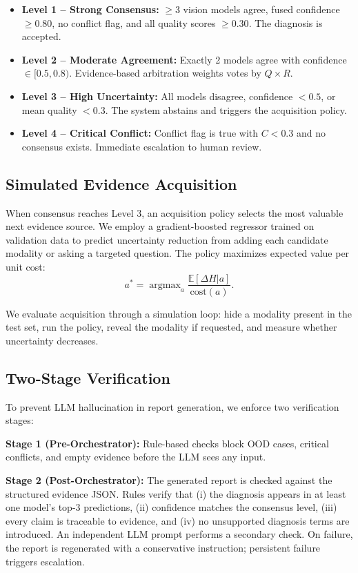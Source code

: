 \documentclass[conference]{IEEEtran}
\newcommand{\expect}[1]{\mathbb{E}\left[#1\right]}
\DeclareMathOperator*{\argmax}{argmax}
\begin{document}
\begin{itemize}
    \item \textbf{Level 1 -- Strong Consensus:} $\geq 3$ vision models agree, fused confidence $\geq 0.80$, no conflict flag, and all quality scores $\geq 0.30$. The diagnosis is accepted.
    \item \textbf{Level 2 -- Moderate Agreement:} Exactly 2 models agree with confidence $\in [0.5, 0.8)$. Evidence-based arbitration weights votes by $Q \times R$.
    \item \textbf{Level 3 -- High Uncertainty:} All models disagree, confidence $< 0.5$, or mean quality $< 0.3$. The system abstains and triggers the acquisition policy.
    \item \textbf{Level 4 -- Critical Conflict:} Conflict flag is true with $C < 0.3$ and no consensus exists. Immediate escalation to human review.
\end{itemize}

\subsection{Simulated Evidence Acquisition}

When consensus reaches Level 3, an acquisition policy selects the most valuable next evidence source. We employ a gradient-boosted regressor trained on validation data to predict uncertainty reduction from adding each candidate modality or asking a targeted question. The policy maximizes expected value per unit cost:
\begin{equation}
a^* = \argmax_a \frac{\expect{\Delta H | a}}{\text{cost}(a)}.
\end{equation}

We evaluate acquisition through a simulation loop: hide a modality present in the test set, run the policy, reveal the modality if requested, and measure whether uncertainty decreases.

\subsection{Two-Stage Verification}

To prevent LLM hallucination in report generation, we enforce two verification stages:

\textbf{Stage 1 (Pre-Orchestrator):} Rule-based checks block OOD cases, critical conflicts, and empty evidence before the LLM sees any input.

\textbf{Stage 2 (Post-Orchestrator):} The generated report is checked against the structured evidence JSON. Rules verify that (i) the diagnosis appears in at least one model's top-3 predictions, (ii) confidence matches the consensus level, (iii) every claim is traceable to evidence, and (iv) no unsupported diagnosis terms are introduced. An independent LLM prompt performs a secondary check. On failure, the report is regenerated with a conservative instruction; persistent failure triggers escalation.
\end{document}
